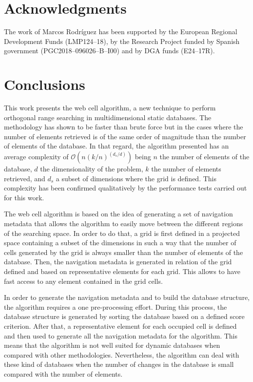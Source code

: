 \documentclass[review]{elsarticle}
\begin{document}
\section{Acknowledgments}
\label{acknowledgments}

The work of Marcos Rodr\'iguez has been supported by the European Regional Development Funds (LMP124--18), by the Research Project funded by Spanish government (PGC2018--096026--B--I00) and by DGA funds (E24--17R).



\section{Conclusions}
\label{sec:conclusions}

This work presents the web cell algorithm, a new technique to perform orthogonal range searching in multidimensional static databases. The methodology has shown to be faster than brute force but in the cases where the number of elements retrieved is of the same order of magnitude than the number of elements of the database. In that regard, the algorithm presented has an average complexity of $\mathcal{O}(n\left(k/n\right)^{(d_s/d)})$ being $n$ the number of elements of the database, $d$ the dimensionality of the problem, $k$ the number of elements retrieved, and $d_s$ a subset of dimensions where the grid is defined. This complexity has been confirmed qualitatively by the performance tests carried out for this work.

The web cell algorithm is based on the idea of generating a set of navigation metadata that allows the algorithm to easily move between the different regions of the searching space. In order to do that, a grid is first defined in a projected space containing a subset of the dimensions in such a way that the number of cells generated by the grid is always smaller than the number of elements of the database. Then, the navigation metadata is generated in relation of the grid defined and based on representative elements for each grid. This allows to have fast access to any element contained in the grid cells.

In order to generate the navigation metadata and to build the database structure, the algorithm requires a one pre-processing effort. During this process, the database structure is generated by sorting the database based on a defined score criterion. After that, a representative element for each occupied cell is defined and then used to generate all the navigation metadata for the algorithm. This means that the algorithm is not well suited for dynamic databases when compared with other methodologies. Nevertheless, the algorithm can deal with these kind of databases when the number of changes in the database is small compared with the number of elements.
\end{document}
